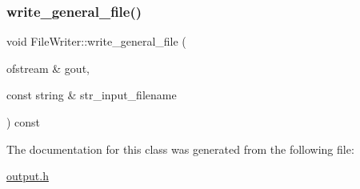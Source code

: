 \mbox{\label{classFileWriter_afb93486e0ae9be60cb67b291d78e0c0b}} 
\subsubsection{\texorpdfstring{write\+\_\+general\+\_\+file()}{write\_general\_file()}}
{\footnotesize\ttfamily void File\+Writer\+::write\+\_\+general\+\_\+file (\begin{DoxyParamCaption}\item[{ofstream \&}]{gout,  }\item[{const string \&}]{str\+\_\+input\+\_\+filename }\end{DoxyParamCaption}) const}



The documentation for this class was generated from the following file\+:\begin{DoxyCompactItemize}
\item 
\hyperlink{output_8h}{output.\+h}\end{DoxyCompactItemize}
